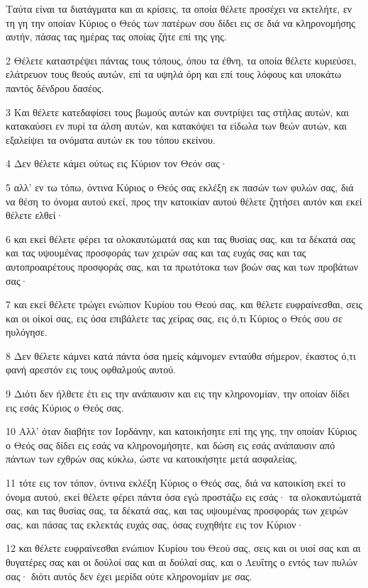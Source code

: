 \par Ταύτα είναι τα διατάγματα και αι κρίσεις, τα οποία θέλετε προσέχει να εκτελήτε, εν τη γη την οποίαν Κύριος ο Θεός των πατέρων σου δίδει εις σε διά να κληρονομήσης αυτήν, πάσας τας ημέρας τας οποίας ζήτε επί της γης.
\par 2 Θέλετε καταστρέψει πάντας τους τόπους, όπου τα έθνη, τα οποία θέλετε κυριεύσει, ελάτρευον τους θεούς αυτών, επί τα υψηλά όρη και επί τους λόφους και υποκάτω παντός δένδρου δασέος.
\par 3 Και θέλετε κατεδαφίσει τους βωμούς αυτών και συντρίψει τας στήλας αυτών, και κατακαύσει εν πυρί τα άλση αυτών, και κατακόψει τα είδωλα των θεών αυτών, και εξαλείψει τα ονόματα αυτών εκ του τόπου εκείνου.
\par 4 Δεν θέλετε κάμει ούτως εις Κύριον τον Θεόν σας·
\par 5 αλλ' εν τω τόπω, όντινα Κύριος ο Θεός σας εκλέξη εκ πασών των φυλών σας, διά να θέση το όνομα αυτού εκεί, προς την κατοικίαν αυτού θέλετε ζητήσει αυτόν και εκεί θέλετε ελθεί·
\par 6 και εκεί θέλετε φέρει τα ολοκαυτώματά σας και τας θυσίας σας, και τα δέκατά σας και τας υψουμένας προσφοράς των χειρών σας και τας ευχάς σας και τας αυτοπροαιρέτους προσφοράς σας, και τα πρωτότοκα των βοών σας και των προβάτων σας·
\par 7 και εκεί θέλετε τρώγει ενώπιον Κυρίου του Θεού σας, και θέλετε ευφραίνεσθαι, σεις και οι οίκοί σας, εις όσα επιβάλετε τας χείρας σας, εις ό,τι Κύριος ο Θεός σου σε ηυλόγησε.
\par 8 Δεν θέλετε κάμνει κατά πάντα όσα ημείς κάμνομεν ενταύθα σήμερον, έκαστος ό,τι φανή αρεστόν εις τους οφθαλμούς αυτού.
\par 9 Διότι δεν ήλθετε έτι εις την ανάπαυσιν και εις την κληρονομίαν, την οποίαν δίδει εις εσάς Κύριος ο Θεός σας.
\par 10 Αλλ' όταν διαβήτε τον Ιορδάνην, και κατοικήσητε επί της γης, την οποίαν Κύριος ο Θεός σας δίδει εις εσάς να κληρονομήσητε, και δώση εις εσάς ανάπαυσιν από πάντων των εχθρών σας κύκλω, ώστε να κατοικήσητε μετά ασφαλείας,
\par 11 τότε εις τον τόπον, όντινα εκλέξη Κύριος ο Θεός σας, διά να κατοικίση εκεί το όνομα αυτού, εκεί θέλετε φέρει πάντα όσα εγώ προστάζω εις εσάς· τα ολοκαυτώματά σας, και τας θυσίας σας, τα δέκατά σας, και τας υψουμένας προσφοράς των χειρών σας, και πάσας τας εκλεκτάς ευχάς σας, όσας ευχηθήτε εις τον Κύριον·
\par 12 και θέλετε ευφραίνεσθαι ενώπιον Κυρίου του Θεού σας, σεις και οι υιοί σας και αι θυγατέρες σας και οι δούλοί σας και αι δούλαί σας, και ο Λευΐτης ο εντός των πυλών σας· διότι αυτός δεν έχει μερίδα ούτε κληρονομίαν με σας.
